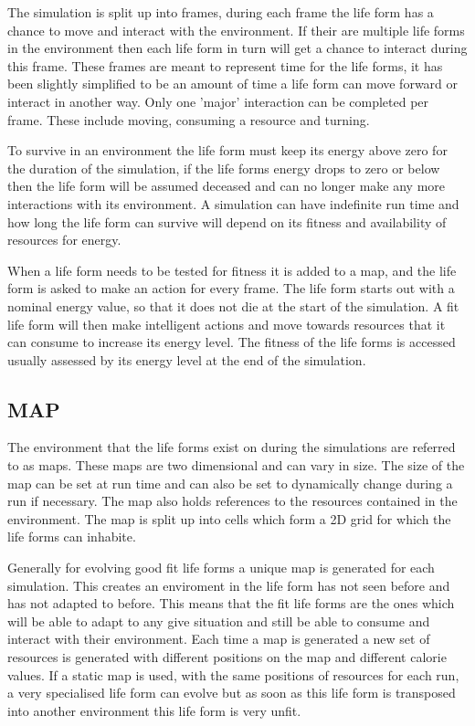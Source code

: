 \documentclass[10pt,twocolumn]{article}
\begin{document}
The simulation is split up into frames, during each frame the life form has a chance to move and interact with the environment. If their
are multiple life forms in the environment then each life form in turn will get a chance to interact during this frame. These frames are
meant to represent time for the life forms, it has been slightly simplified to be an amount of time a life form can move forward or interact in another way. Only one 'major' interaction can be completed per frame. These include moving, consuming a resource and turning.

To survive in an environment the life form must keep its energy above zero for the duration of the simulation, if the life forms energy
drops to zero or below then the life form will be assumed deceased and can no longer make any more interactions with its environment. A simulation can have indefinite run time and how long the life form can survive will depend on its fitness and availability of resources for energy.

When a life form needs to be tested for fitness it is added to a map, and the life form is asked to make an action for every frame. The life form starts out
with a nominal energy value, so that it does not die at the start of the simulation. A fit life form will then make intelligent actions and move towards resources
that it can consume to increase its energy level. The fitness of the life forms is accessed usually assessed by its energy level at the end of the simulation. 


\subsection{MAP}

The environment that the life forms exist on during the simulations are referred to as maps. These maps are two dimensional and can vary in size.
The size of the map can be set at run time and can also be set to dynamically change during a run if necessary. The map also holds references
to the resources contained in the environment. The map is split up into cells which form a 2D grid for which the life forms can inhabite. 

Generally for evolving good fit life forms a unique map is generated for each simulation. This creates an enviroment in the life form has not
seen before and has not adapted to before. This means that the fit life forms are the ones which will be able to adapt to any give situation
and still be able to consume and interact with their environment. Each time a map is generated a new set of resources is generated with different
positions on the map and different calorie values. If a static map is used, with the same positions of resources for each run, a very specialised 
life form can evolve but as soon as this life form is transposed into another environment this life form is very unfit.
\end{document}
